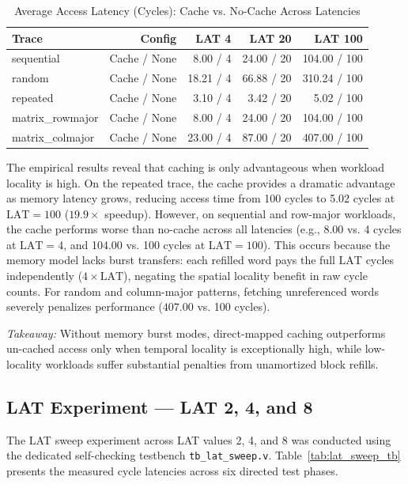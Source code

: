 \documentclass[conference]{IEEEtran}
\begin{document}
\begin{table}[htbp]
\caption{Average Access Latency (Cycles): Cache vs. No-Cache Across Latencies}
\label{tab:nocache}
\centering
\begin{tabular}{lrrrr}
\toprule
\textbf{Trace} & \textbf{Config} & \textbf{LAT 4} & \textbf{LAT 20} & \textbf{LAT 100} \\
\midrule
sequential & Cache / None & 8.00 / 4 & 24.00 / 20 & 104.00 / 100 \\
random & Cache / None & 18.21 / 4 & 66.88 / 20 & 310.24 / 100 \\
repeated & Cache / None & 3.10 / 4 & 3.42 / 20 & 5.02 / 100 \\
matrix\_rowmajor & Cache / None & 8.00 / 4 & 24.00 / 20 & 104.00 / 100 \\
matrix\_colmajor & Cache / None & 23.00 / 4 & 87.00 / 20 & 407.00 / 100 \\
\bottomrule
\end{tabular}
\end{table}

The empirical results reveal that caching is only advantageous when workload locality is high. On the repeated trace, the cache provides a dramatic advantage as memory latency grows, reducing access time from 100 cycles to 5.02 cycles at $\text{LAT}=100$ ($19.9\times$ speedup). However, on sequential and row-major workloads, the cache performs worse than no-cache across all latencies (e.g., 8.00 vs. 4 cycles at $\text{LAT}=4$, and 104.00 vs. 100 cycles at $\text{LAT}=100$). This occurs because the memory model lacks burst transfers: each refilled word pays the full $\text{LAT}$ cycles independently ($4 \times \text{LAT}$), negating the spatial locality benefit in raw cycle counts. For random and column-major patterns, fetching unreferenced words severely penalizes performance ($407.00$ vs. 100 cycles).

\textit{Takeaway:} Without memory burst modes, direct-mapped caching outperforms un-cached access only when temporal locality is exceptionally high, while low-locality workloads suffer substantial penalties from unamortized block refills.

\subsection{LAT Experiment --- LAT 2, 4, and 8}
The LAT sweep experiment across LAT values 2, 4, and 8 was conducted using the dedicated self-checking testbench \texttt{tb\_lat\_sweep.v}. Table~\ref{tab:lat_sweep_tb} presents the measured cycle latencies across six directed test phases.
\end{document}
